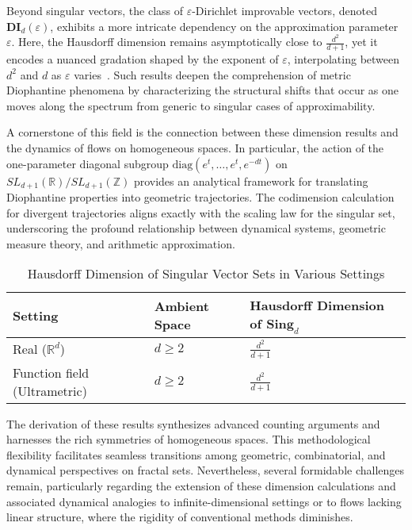 \documentclass[sigconf]{acmart}
\begin{document}
Beyond singular vectors, the class of $\varepsilon$-Dirichlet improvable vectors, denoted $\mathbf{DI}_d(\varepsilon)$, exhibits a more intricate dependency on the approximation parameter $\varepsilon$. Here, the Hausdorff dimension remains asymptotically close to $\frac{d^2}{d+1}$, yet it encodes a nuanced gradation shaped by the exponent of $\varepsilon$, interpolating between $d^2$ and $d$ as $\varepsilon$ varies~\cite{ref109}. Such results deepen the comprehension of metric Diophantine phenomena by characterizing the structural shifts that occur as one moves along the spectrum from generic to singular cases of approximability.

A cornerstone of this field is the connection between these dimension results and the dynamics of flows on homogeneous spaces. In particular, the action of the one-parameter diagonal subgroup $\mathrm{diag}(e^t, \ldots, e^t, e^{-dt})$ on $SL_{d+1}(\mathbb{R})/SL_{d+1}(\mathbb{Z})$ provides an analytical framework for translating Diophantine properties into geometric trajectories. The codimension calculation for divergent trajectories aligns exactly with the scaling law for the singular set, underscoring the profound relationship between dynamical systems, geometric measure theory, and arithmetic approximation.

\begin{table*}[htbp]
\centering
\caption{Hausdorff Dimension of Singular Vector Sets in Various Settings}
\label{tab:dimension_comparison}
\begin{adjustbox}{max width=\textwidth}
\begin{tabular}{lll}
\toprule
\textbf{Setting} & \textbf{Ambient Space} & \textbf{Hausdorff Dimension of $\mathbf{Sing}_d$} \\
\midrule
Real ($\mathbb{R}^d$) & $d \geq 2$ & $\frac{d^2}{d+1}$ \\
Function field (Ultrametric) & $d \geq 2$ & $\frac{d^2}{d+1}$ \\
\bottomrule
\end{tabular}
\end{adjustbox}
\end{table*}

The derivation of these results synthesizes advanced counting arguments and harnesses the rich symmetries of homogeneous spaces. This methodological flexibility facilitates seamless transitions among geometric, combinatorial, and dynamical perspectives on fractal sets. Nevertheless, several formidable challenges remain, particularly regarding the extension of these dimension calculations and associated dynamical analogies to infinite-dimensional settings or to flows lacking linear structure, where the rigidity of conventional methods diminishes.
\end{document}

